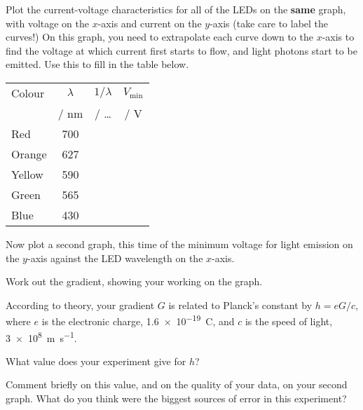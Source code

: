 \begin{questions}
\question Plot the current-voltage characteristics for all of the LEDs on the {\bf same} graph, with voltage on the $x$-axis and current on the $y$-axis (take care to label the curves!)  On this graph, you need to extrapolate each curve down to the $x$-axis to find the voltage at which current first starts to flow, and light photons start to be emitted.  Use this to fill in the table below.

\begin{center}
\begin{tabular}{|l|c|p{2cm}|p{2cm}|}
\hline
Colour & $\lambda$ &  \multicolumn{1}{|c|}{$1/\lambda$ } & \multicolumn{1}{|c|}{$V_{\text{min}}$}\\
 & / nm & \multicolumn{1}{|c|}{/ \ldots} & \multicolumn{1}{|c|}{/ V} \\
\hline
Red & 700 & &\\
\hline
Orange & 627 & &\\
\hline
Yellow & 590 & &\\
\hline
Green & 565 & &\\
\hline
Blue & 430 & &\\
\hline
\end{tabular}
\end{center}

\question Now plot a second graph, this time of the minimum voltage for light emission on the $y$-axis against the LED wavelength on the $x$-axis.

\question Work out the gradient, showing your working on the graph. \answerline

According to theory, your gradient $G$ is related to Planck's constant by $h=eG/c$, where $e$ is the electronic charge, \SI{1.6e-19}{C}, and $c$ is the speed of light, \SI{3e8}{m.s^{-1}}.

\question What value does your experiment give for $h$? \answerline

\question Comment briefly on this value, and on the quality of your data, on your second graph. What do you think were the biggest sources of error in this experiment?
\end{questions}
